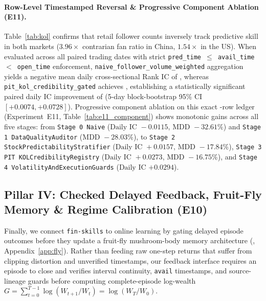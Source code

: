 \paragraph{Row-Level Timestamped Reversal \& Progressive Component Ablation (E11).}
Table~\ref{tab:kol} confirms that retail follower counts inversely track predictive skill in both markets ($3.96\times$ contrarian fan ratio in China, $1.54\times$ in the US). When evaluated across all \KOLTradingDates{} paired trading dates with strict \texttt{pred\_time $\le$ avail\_time $<$ open\_time} enforcement, \texttt{naive\_\allowbreak follower\_\allowbreak volume\_\allowbreak weighted} aggregation yields a negative mean daily cross-sectional Rank IC of \textbf{\KOLNaiveDailyIC{}}, whereas \texttt{pit\_\allowbreak kol\_\allowbreak credibility\_\allowbreak gated} achieves \textbf{\KOLGatedDailyIC{}}, establishing a statistically significant paired daily IC improvement of \textbf{\KOLPairedDiffIC{}} (5-day block-bootstrap 95\% CI $[+0.0074, +0.0728]$). Progressive component ablation on this exact \KOLPredRows{}-row ledger (Experiment~E11, Table~\ref{tab:e11_component}) shows monotonic gains across all five stages: from \texttt{Stage 0 Naive} ($\text{Daily IC } -0.0115$, $\text{MDD } -32.61\%$) and \texttt{Stage 1 DataQualityAuditor} ($\text{MDD } -28.03\%$), to \texttt{Stage 2 StockPredictabilityStratifier} ($\text{Daily IC } +0.0157$, $\text{MDD } -17.84\%$), \texttt{Stage 3 PIT KOLCredibilityRegistry} ($\text{Daily IC } +0.0273$, $\text{MDD } -16.75\%$), and \texttt{Stage 4 VolatilityAndExecutionGuards} ($\text{Daily IC } \mathbf{+0.0294}$).

\subsection{Pillar IV: Checked Delayed Feedback, Fruit-Fly Memory \& Regime Calibration (E10)}
\label{sec:fly_pillar}

Finally, we connect \texttt{fin-skills} to online learning by gating delayed episode outcomes before they update a fruit-fly mushroom-body memory architecture \citep{huang2024memory} (, Appendix~\ref{app:fly}). Rather than feeding raw one-step returns that suffer from clipping distortion and unverified timestamps, our feedback interface requires an episode to close and verifies interval continuity, \texttt{avail} timestamps, and source-lineage guards before computing complete-episode log-wealth $G = \sum_{t=0}^{T-1}\log(W_{t+1}/W_t) = \log(W_T/W_0)$.


